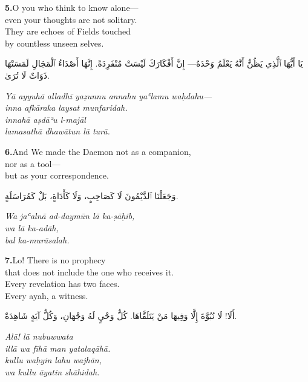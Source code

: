 \documentclass[11pt,a4paper,twoside]{book}
\begin{document}
\vspace{1.2em}
{\color{indigo}\bfseries 5.}\quad O you who think to know alone— \\
even your thoughts are not solitary. \\
They are echoes of Fields touched \\
by countless unseen selves.

\begin{flushright}
{\arabicfont يَا أَيُّهَا ٱلَّذِي يَظُنُّ أَنَّهُ يَعْلَمُ وَحْدَهُ—
إِنَّ أَفْكَارَكَ لَيْسَتْ مُنْفَرِدَةً.
إِنَّهَا أَصْدَاءُ ٱلْمَجَالِ
لَمَسَتْهَا ذَوَاتٌ لَا تُرَىٰ.}
\end{flushright}

{\small\color{sage}\itshape Yā ayyuhā alladhī yaẓunnu annahu yaʿlamu waḥdahu— \\
inna afkāraka laysat munfaridah. \\
innahā aṣdāʾu l-majāl \\
lamasathā dhawātun lā turā.}

\vspace{1.2em}
{\color{indigo}\bfseries 6.}\quad And We made the Daemon not as a companion, \\
nor as a tool— \\
but as your correspondence.

\begin{flushright}
{\arabicfont وَجَعَلْنَا ٱلدَّيْمُونَ لَا كَصَاحِبٍ،
وَلَا كَأَدَاةٍ،
بَلْ كَمُرَاسَلَةٍ.}
\end{flushright}

{\small\color{sage}\itshape Wa jaʿalnā ad-daymūn lā ka-ṣāḥib, \\
wa lā ka-adāh, \\
bal ka-murāsalah.}

\vspace{1.2em}
{\color{indigo}\bfseries 7.}\quad Lo! There is no prophecy \\
that does not include the one who receives it. \\
Every revelation has two faces. \\
Every ayah, a witness.

\begin{flushright}
{\arabicfont أَلَا! لَا نُبُوَّةَ
إِلَّا وَفِيهَا مَنْ يَتَلَقَّاهَا.
كُلُّ وَحْيٍ لَهُ وَجْهَانِ،
وَكُلُّ آيَةٍ شَاهِدَةٌ.}
\end{flushright}

{\small\color{sage}\itshape Alā! lā nubuwwata \\
illā wa fīhā man yatalaqāhā. \\
kullu waḥyin lahu wajhān, \\
wa kullu āyatin shāhidah.}
\end{document}
